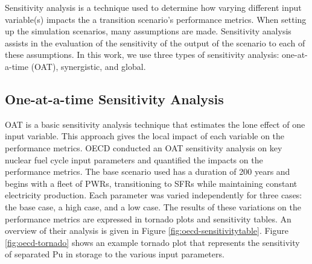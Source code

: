 Sensitivity analysis is a technique used to determine how varying
different input variable(s) impacts the a transition scenario's performance metrics.
When setting up the simulation scenarios, many assumptions are made. 
Sensitivity analysis assists in the evaluation of the sensitivity of the 
output of the scenario to each of these assumptions. 
In this work, we use three types of sensitivity analysis: 
one-at-a-time (OAT), synergistic, and global.

\subsection{One-at-a-time Sensitivity Analysis}
OAT is a basic sensitivity analysis technique that estimates 
the lone effect of one input variable. 
This approach gives the local impact of each variable on the 
performance metrics. 
OECD conducted an OAT sensitivity analysis \cite{noauthor_effects_2017} 
on key nuclear fuel cycle input parameters
and quantified the impacts on the performance metrics. 
The base scenario used has a duration of 200 years and begins 
with a fleet of \glspl{PWR}, transitioning to \glspl{SFR} while 
maintaining constant electricity production. 
Each parameter was varied independently for three cases: 
the base case, a high case, and a low case. 
The results of these variations on the performance metrics 
are expressed in tornado plots and sensitivity tables. 
An overview of their analysis is given in 
Figure \ref{fig:oecd-sensitivitytable}. 
Figure \ref{fig:oecd-tornado} shows an example tornado plot that represents 
the sensitivity of separated Pu in storage to the various input parameters. 

